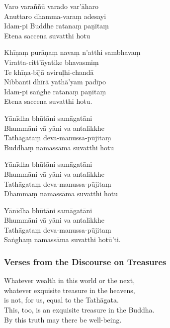 \begin{paritta}
Varo varaññū varado var'āharo\\
Anuttaro dhamma-varaṃ adesayi\\
Idam-pi Buddhe ratanaṃ paṇītaṃ\\
Etena saccena suvatthi hotu

%
Khīṇaṃ purāṇaṃ navaṃ n'atthi sambhavaṃ\\
Viratta-citt'āyatike bhavasmiṃ\\
Te khīṇa-bījā aviruḷhi-chandā\\
Nibbanti dhīrā yathā'yam padīpo\\
Idam-pi saṅghe ratanaṃ paṇītaṃ\\
Etena saccena suvatthi hotu.

Yānīdha bhūtāni samāgatāni\\
Bhummāni vā yāni va antalikkhe\\
Tathāgataṃ deva-manussa-pūjitaṃ\\
Buddhaṃ namassāma suvatthi hotu

Yānīdha bhūtāni samāgatāni\\
Bhummāni vā yāni va antalikkhe\\
Tathāgataṃ deva-manussa-pūjitaṃ\\
Dhammaṃ namassāma suvatthi hotu

Yānīdha bhūtāni samāgatāni\\
Bhummāni vā yāni va antalikkhe\\
Tathāgataṃ deva-manussa-pūjitaṃ\\
Saṅghaṃ namassāma suvatthi hotū'ti. 

\end{paritta}

\subsubsection{Verses from the Discourse on Treasures}


%
Whatever wealth in this world or the next,\\
whatever exquisite treasure in the heavens,\\
is not, for us, equal to the Tathāgata.\\
This, too, is an exquisite treasure in the Buddha.\\
By this truth may there be well-being.

\enlargethispage{\baselineskip}

